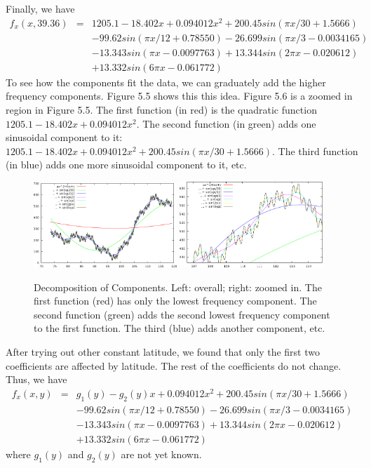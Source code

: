 \documentclass[a4paper]{article}
\begin{document}
Finally, we have
\begin{eqnarray}
f_x(x,39.36) & = & 1205.1 -18.402x +0.094012x^2 +200.45sin(\pi x/30+1.5666) \nonumber \\
             &   & -99.62sin(\pi x/12+0.78550) -26.699sin(\pi x/3-0.0034165) \nonumber \\
             &   & -13.343sin(\pi x-0.0097763) +13.344sin(2\pi x-0.020612) \nonumber \\
             &   & +13.332sin(6\pi x-0.061772)
\end{eqnarray}
To see how the components fit the data, we can graduately add
the higher frequency components. Figure 5.5 shows this this idea. Figure 5.6 is
a zoomed in region in Figure 5.5. The first function (in red) is the quadratic
function $1205.1 -18.402x +0.094012x^2$. The second function (in green) adds
one sinusoidal component to it: $1205.1 -18.402x +0.094012x^2 +200.45sin(\pi
x/30+1.5666)$. The third function (in blue) adds one more sinusoidal component
to it, etc.
\begin{figure}[htb]
\begin{center}
\includegraphics[width=0.48\textwidth]{fxx-lc3.png}
\includegraphics[width=0.48\textwidth]{fxx-lc4.png}
\end{center}
\caption{Decomposition of Components.
Left: overall; right: zoomed in.
The first function (red) has only the lowest frequency component.
The second function (green) adds the second lowest frequency component to the
first function.
The third (blue) adds another component, etc.}
\label{fig:fxx-lc3}
\end{figure}

After trying out other constant latitude, we found that only the first two
coefficients are affected by latitude. The rest of the coefficients do not
change. Thus, we have
\begin{eqnarray}
\label{eq:fxx}
f_x(x,y) &=& g_1(y) -g_2(y)x +0.094012x^2 +200.45sin(\pi x/30+1.5666) \nonumber \\
         & & -99.62sin(\pi x/12+0.78550) -26.699sin(\pi x/3-0.0034165) \nonumber \\
         & & -13.343sin(\pi x-0.0097763) +13.344sin(2\pi x-0.020612) \nonumber \\
         & & +13.332sin(6\pi x-0.061772)
\end{eqnarray}
where $g_1(y)$ and $g_2(y)$ are not yet known.
\end{document}
